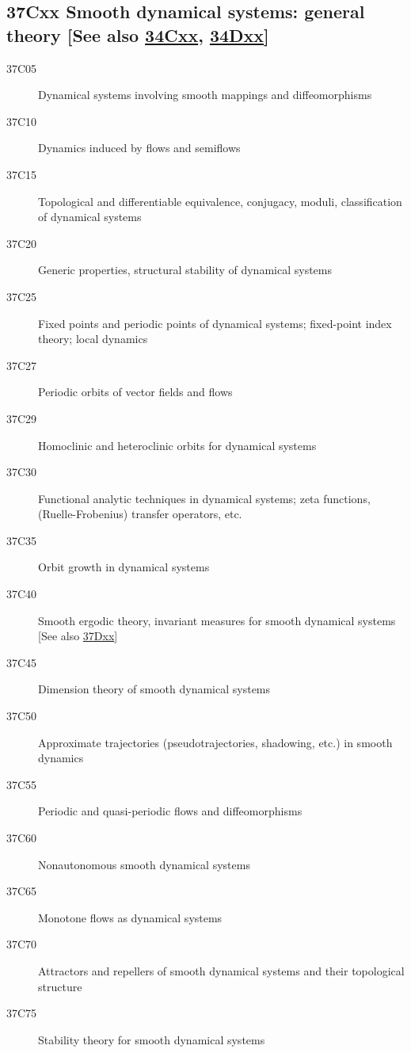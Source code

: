 \documentclass[letterpaper]{article}
\begin{document}
\subsection*{37Cxx  Smooth dynamical systems: general theory [See also \hyperref[34Cxx]{34Cxx}, \hyperref[34Dxx]{34Dxx}] }\label{37Cxx}
\begin{description}  
\item [37C05]\label{37C05} Dynamical systems involving smooth mappings and diffeomorphisms
\item [37C10]\label{37C10} Dynamics induced by flows and semiflows
\item [37C15]\label{37C15} Topological and differentiable equivalence, conjugacy,  moduli, classification of dynamical systems
\item [37C20]\label{37C20} Generic properties, structural stability of dynamical systems
\item [37C25]\label{37C25} Fixed points and periodic points of dynamical systems; fixed-point index theory; local dynamics
\item [37C27]\label{37C27} Periodic orbits of vector fields and flows
\item [37C29]\label{37C29} Homoclinic and heteroclinic orbits for dynamical systems
\item [37C30]\label{37C30} Functional analytic techniques in dynamical systems; zeta functions, (Ruelle-Frobenius) transfer operators, etc. 
\item [37C35]\label{37C35} Orbit growth in dynamical systems
\item [37C40]\label{37C40} Smooth ergodic theory, invariant measures for smooth dynamical systems [See also \hyperref[37Dxx]{37Dxx}]
\item [37C45]\label{37C45} Dimension theory of smooth dynamical systems
\item [37C50]\label{37C50} Approximate trajectories (pseudotrajectories, shadowing, etc.) in smooth dynamics 
\item [37C55]\label{37C55} Periodic and quasi-periodic flows and diffeomorphisms 
\item [37C60]\label{37C60} Nonautonomous smooth dynamical systems
\item [37C65]\label{37C65} Monotone flows as dynamical systems
\item [37C70]\label{37C70} Attractors and repellers of smooth dynamical systems and their topological structure 
\item [37C75]\label{37C75} Stability theory for smooth dynamical systems

\end{description}
\end{document}

